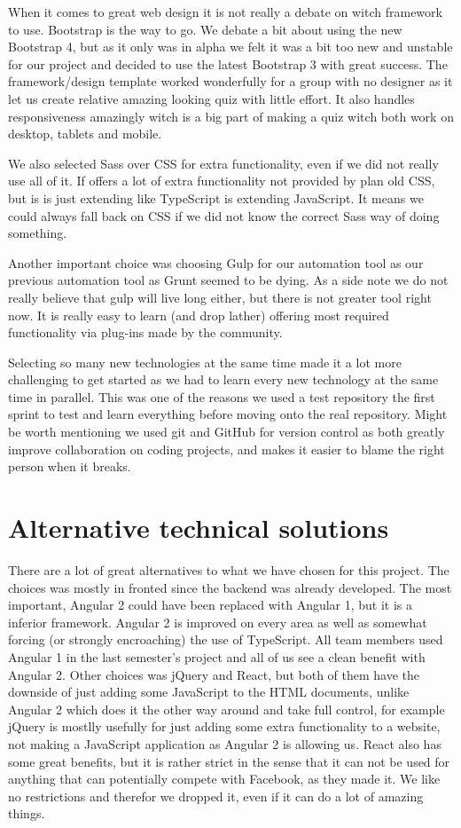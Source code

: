 When it comes to great web design it is not really a debate on witch framework to use. Bootstrap is the way to go. We debate a bit about using the new Bootstrap 4, but as it only was in alpha we felt it was a bit too new and unstable for our project and decided to use the latest Bootstrap 3 with great success. The framework/design template worked wonderfully for a group with no designer as it let us create relative amazing looking quiz with little effort. It also handles responsiveness amazingly witch is a big part of making a quiz witch both work on desktop, tablets and mobile.

We also selected Sass\cite{Sass:14:online} over CSS for extra functionality, even if we did not really use all of it. If offers a lot of extra functionality not provided by plan old CSS, but is is just extending like TypeScript is extending JavaScript. It means we could always fall back on CSS if we did not know the correct Sass way of doing something. 

Another important choice was choosing Gulp for our automation tool as our previous automation tool as Grunt seemed to be dying. As a side note we do not really believe that gulp will live long either, but there is not greater tool right now. It is really easy to learn (and drop lather) offering most required functionality via plug-ins made by the community.

Selecting so many new technologies at the same time made it a lot more challenging to get started as we had to learn every new technology at the same time in parallel. This was one of the reasons we used a test repository the first sprint to test and learn everything before moving onto the real repository. Might be worth mentioning we used git and GitHub for version control as both greatly improve collaboration on coding projects, and makes it easier to blame the right person when it breaks.

\section{Alternative technical solutions}
\label{sec:alttec}

There are a lot of great alternatives to what we have chosen for this project. The choices was mostly in fronted since the backend was already developed. The most important, Angular 2 could have been replaced with Angular 1, but it is a inferior framework. Angular 2 is improved on every area as well as somewhat forcing (or strongly encroaching) the use of TypeScript. All team members used Angular 1 in the last semester's project and all of us see a clean benefit with Angular 2. Other choices was jQuery and React, but both of them have the downside of just adding some JavaScript to the HTML documents, unlike Angular 2 which does it the other way around and take full control, for example jQuery is mostlly usefully for just adding some extra functionality to a website, not making a JavaScript application as Angular 2 is allowing us. React also has some great benefits, but it is rather strict in the sense that it can not be used for anything that can potentially compete  with Facebook, as they made it. We like no restrictions and therefor we dropped it, even if it can do a lot of amazing things.

